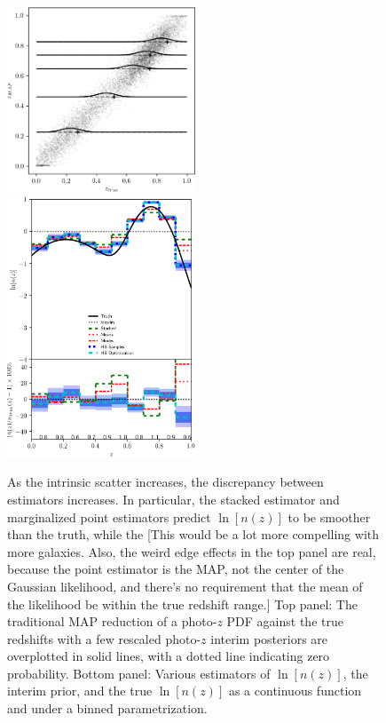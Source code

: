 \documentclass[iop]{emulateapj}
\begin{document}
\begin{figure}
	\begin{center}
		
\includegraphics[width=0.5\textwidth]{fig/high_scatter/scatter.png}\\
		
\includegraphics[width=0.5\textwidth]{fig/high_scatter/estimators.png}		
		\caption{As the intrinsic scatter increases, the discrepancy 
between estimators increases.  In particular, the stacked estimator and 
marginalized point estimators predict $\ln[n(z)]$ to be smoother than the 
truth, while the  [This would be a lot more compelling with more galaxies.  
Also, the weird edge effects in the top panel are real, because the point 
estimator is the MAP, not the center of the Gaussian likelihood, and there's no 
requirement that the mean of the likelihood be within the true redshift range.] 
 Top panel: The traditional MAP reduction of a photo-$z$ PDF against the true 
redshifts with a few rescaled photo-$z$ interim posteriors are overplotted in 
solid lines, with a dotted line indicating zero probability.  Bottom panel: 
Various estimators of $\ln[n(z)]$, the interim prior, and the true $\ln[n(z)]$ 
as a continuous function and under a binned parametrization.}
		\label{fig:intscat}
	\end{center}
\end{figure}
\end{document}
